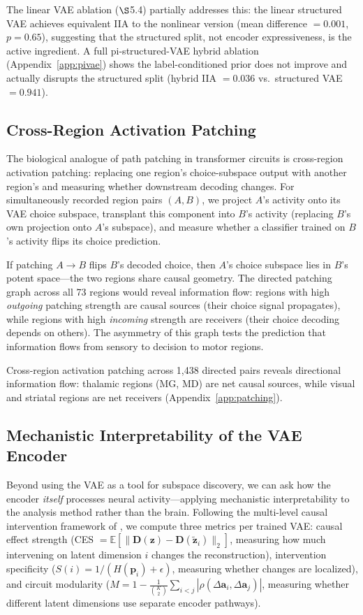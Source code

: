 \documentclass{article}
\begin{document}
The linear VAE ablation ($\S$5.4) partially addresses this: the linear structured VAE achieves equivalent IIA to the nonlinear version (mean difference $= 0.001$, $p = 0.65$), suggesting that the structured split, not encoder expressiveness, is the active ingredient. A full pi-structured-VAE hybrid ablation (Appendix~\ref{app:pivae}) shows the label-conditioned prior does not improve and actually disrupts the structured split (hybrid IIA $= 0.036$ vs.\ structured VAE $= 0.941$).

\subsection{Cross-Region Activation Patching}

The biological analogue of path patching in transformer circuits \citep{geiger2024finding} is cross-region activation patching: replacing one region's choice-subspace output with another region's and measuring whether downstream decoding changes. For simultaneously recorded region pairs $(A, B)$, we project $A$'s activity onto its VAE choice subspace, transplant this component into $B$'s activity (replacing $B$'s own projection onto $A$'s subspace), and measure whether a classifier trained on $B$'s activity flips its choice prediction.

If patching $A \to B$ flips $B$'s decoded choice, then $A$'s choice subspace lies in $B$'s potent space---the two regions share causal geometry. The directed patching graph across all 73 regions would reveal information flow: regions with high \emph{outgoing} patching strength are causal sources (their choice signal propagates), while regions with high \emph{incoming} strength are receivers (their choice decoding depends on others). The asymmetry of this graph tests the prediction that information flows from sensory to decision to motor regions.

Cross-region activation patching across 1,438 directed pairs reveals directional information flow: thalamic regions (MG, MD) are net causal sources, while visual and striatal regions are net receivers (Appendix~\ref{app:patching}).

\subsection{Mechanistic Interpretability of the VAE Encoder}

Beyond using the VAE as a tool for subspace discovery, we can ask how the encoder \emph{itself} processes neural activity---applying mechanistic interpretability to the analysis method rather than the brain. Following the multi-level causal intervention framework of \citet{martinez2025vae_circuits}, we compute three metrics per trained VAE: causal effect strength (CES $= \mathbb{E}[\|\mathbf{D}(\mathbf{z}) - \mathbf{D}(\tilde{\mathbf{z}}_i)\|_2]$, measuring how much intervening on latent dimension $i$ changes the reconstruction), intervention specificity ($S(i) = 1/(H(\mathbf{p}_i) + \epsilon)$, measuring whether changes are localized), and circuit modularity ($M = 1 - \frac{1}{\binom{K}{2}}\sum_{i<j}|\rho(\Delta \mathbf{a}_i, \Delta \mathbf{a}_j)|$, measuring whether different latent dimensions use separate encoder pathways).
\end{document}
